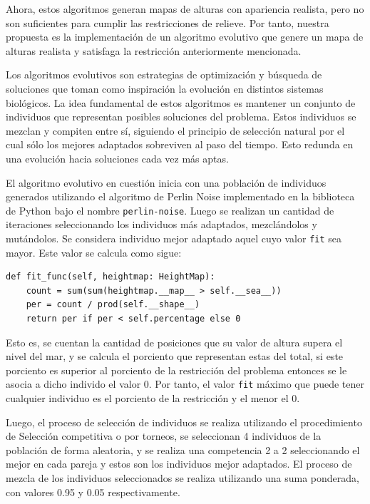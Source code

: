Ahora, estos algoritmos generan mapas de alturas con apariencia realista, pero no son suficientes para cumplir las restricciones de relieve. Por tanto, nuestra propuesta es la implementación de un algoritmo evolutivo que genere un mapa de alturas realista y satisfaga la restricción anteriormente mencionada.

Los algoritmos evolutivos son estrategias de optimización y búsqueda de soluciones que toman como inspiración la evolución en distintos sistemas biológicos. La idea fundamental de estos algoritmos es mantener un conjunto de individuos que representan posibles soluciones del problema. Estos individuos se mezclan y compiten entre sí, siguiendo el principio de selección natural por el cual sólo los mejores adaptados sobreviven al paso del tiempo. Esto redunda en una evolución hacia soluciones cada vez más aptas. 

El algoritmo evolutivo en cuestión inicia con una población de individuos generados utilizando el algoritmo de Perlin Noise implementado en la biblioteca de Python bajo el nombre \verb|perlin-noise|.	Luego se realizan un cantidad de iteraciones seleccionando los individuos más adaptados, mezclándolos y mutándolos.  Se considera individuo mejor adaptado aquel cuyo valor \verb|fit| sea mayor. Este valor se calcula como sigue:

\begin{verbatim}
def fit_func(self, heightmap: HeightMap):
    count = sum(sum(heightmap.__map__ > self.__sea__))
    per = count / prod(self.__shape__)
    return per if per < self.percentage else 0
\end{verbatim}

Esto es, se cuentan la cantidad de posiciones que su valor de altura supera el nivel del mar, y se calcula el porciento que representan estas del total, si este porciento es superior al porciento de la restricción del problema entonces se le asocia a dicho individo el valor 0.  Por tanto, el valor \verb|fit| máximo que puede tener cualquier individuo es el porciento de la restricción y el menor el 0.

Luego, el proceso de selección de individuos se realiza utilizando el procedimiento de Selección competitiva o por torneos, se seleccionan  4 individuos de la población de forma aleatoria, y se realiza una competencia 2 a 2 seleccionando el mejor en cada pareja y estos son los individuos mejor adaptados. El proceso de mezcla de los individuos seleccionados se realiza utilizando una suma ponderada, con valores 0.95 y 0.05 respectivamente. 

